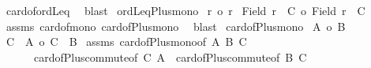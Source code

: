 \begin{isabellebody}
\ card{\isacharunderscore}{\kern0pt}of{\isacharunderscore}{\kern0pt}ordLeq\ \isamarkupfalse%
\ blast\isanewline
{}\isamarkupfalse%
%
\endisatagproof
{\isafoldproof}%
%
\isadelimproof
\isanewline
%
\endisadelimproof
\isanewline
{}\isamarkupfalse%
\ ordLeq{\isacharunderscore}{\kern0pt}Plus{\isacharunderscore}{\kern0pt}mono{}{\isacharcolon}{\kern0pt}\isanewline
{}\ {\isachardoublequoteopen}r\ {\isasymle}o\ r{\isacharprime}{\kern0pt}{\isachardoublequoteclose}\isanewline
{}\ {\isachardoublequoteopen}{\isacharbar}{\kern0pt}{\isacharparenleft}{\kern0pt}Field\ r{\isacharparenright}{\kern0pt}\ {\isacharless}{\kern0pt}{\isacharplus}{\kern0pt}{\isachargreater}{\kern0pt}\ C{\isacharbar}{\kern0pt}\ {\isasymle}o\ {\isacharbar}{\kern0pt}{\isacharparenleft}{\kern0pt}Field\ r{\isacharprime}{\kern0pt}{\isacharparenright}{\kern0pt}\ {\isacharless}{\kern0pt}{\isacharplus}{\kern0pt}{\isachargreater}{\kern0pt}\ C{\isacharbar}{\kern0pt}{\isachardoublequoteclose}\isanewline
%
\isadelimproof
%
\endisadelimproof
%
\isatagproof
{}\isamarkupfalse%
\ assms\ card{\isacharunderscore}{\kern0pt}of{\isacharunderscore}{\kern0pt}mono{}\ card{\isacharunderscore}{\kern0pt}of{\isacharunderscore}{\kern0pt}Plus{\isacharunderscore}{\kern0pt}mono{}\ \isamarkupfalse%
\ blast%
\endisatagproof
{\isafoldproof}%
%
\isadelimproof
\isanewline
%
\endisadelimproof
\isanewline
{}\isamarkupfalse%
\ card{\isacharunderscore}{\kern0pt}of{\isacharunderscore}{\kern0pt}Plus{\isacharunderscore}{\kern0pt}mono{}{\isacharcolon}{\kern0pt}\isanewline
{}\ {\isachardoublequoteopen}{\isacharbar}{\kern0pt}A{\isacharbar}{\kern0pt}\ {\isasymle}o\ {\isacharbar}{\kern0pt}B{\isacharbar}{\kern0pt}{\isachardoublequoteclose}\isanewline
{}\ {\isachardoublequoteopen}{\isacharbar}{\kern0pt}C\ {\isacharless}{\kern0pt}{\isacharplus}{\kern0pt}{\isachargreater}{\kern0pt}\ A{\isacharbar}{\kern0pt}\ {\isasymle}o\ {\isacharbar}{\kern0pt}C\ {\isacharless}{\kern0pt}{\isacharplus}{\kern0pt}{\isachargreater}{\kern0pt}\ B{\isacharbar}{\kern0pt}{\isachardoublequoteclose}\isanewline
%
\isadelimproof
%
\endisadelimproof
%
\isatagproof
{}\isamarkupfalse%
\ assms\ card{\isacharunderscore}{\kern0pt}of{\isacharunderscore}{\kern0pt}Plus{\isacharunderscore}{\kern0pt}mono{}{\isacharbrackleft}{\kern0pt}of\ A\ B\ C{\isacharbrackright}{\kern0pt}\isanewline
\ \ \ \ \ \ card{\isacharunderscore}{\kern0pt}of{\isacharunderscore}{\kern0pt}Plus{\isacharunderscore}{\kern0pt}commute{\isacharbrackleft}{\kern0pt}of\ C\ A{\isacharbrackright}{\kern0pt}\ \ card{\isacharunderscore}{\kern0pt}of{\isacharunderscore}{\kern0pt}Plus{\isacharunderscore}{\kern0pt}commute{\isacharbrackleft}{\kern0pt}of\ B\ C{\isacharbrackright}{\kern0pt}\isanewline

\end{isabellebody}
